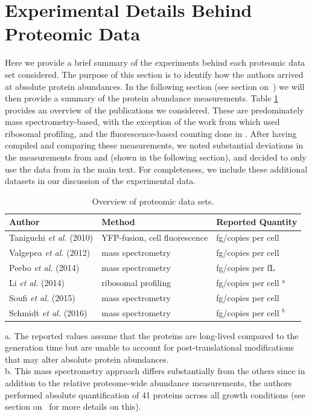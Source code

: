 \section{Experimental Details Behind Proteomic Data}
\label{sec:SI_exp_summary}
Here we provide a brief summary of the experiments behind each proteomic data
set considered. The purpose of this section is to identify how the authors
arrived at absolute protein abundances. In the following section
(see section on~) we will then provide a summary of the
protein abundance measurements. Table \ref{tab:datasets} provides an overview of
the publications we considered. These are predominately mass spectrometry-based,
with the exception of the work from \cite{li2014} which used ribosomal
profiling, and the fluorescence-based counting done in \cite{taniguchi2010}.
After having compiled and comparing these  measurements, we noted substantial
deviations in the measurements from \cite{taniguchi2010} and \cite{soufi2015}
(shown in the following section), and decided to only use the data from
\cite{schmidt2016, li2014, valgepea2013, peebo2015} in the main text. For
completeness, we include these additional datasets in our discussion of the experimental
data.

\begin{table}[bt]
\caption{\label{tab:datasets}Overview of proteomic data sets.}
\begin{tabular}{l l l }
\toprule
Author & Method & Reported Quantity \\
\midrule
Taniguchi \textit{et al.} (2010)  & YFP-fusion, cell fluorescence    & fg/copies per cell      \\
Valgepea \textit{et al.} (2012)   & mass spectrometry                & fg/copies per cell      \\
Peebo \textit{et al.} (2014)      & mass spectrometry                & fg/copies per fL        \\
Li \textit{et al.} (2014)         & ribosomal profiling              & fg/copies per cell $^a$ \\
Soufi \textit{et al.} (2015)      & mass spectrometry                & fg/copies per cell      \\
Schmidt \textit{et al.} (2016)    & mass spectrometry                & fg/copies per cell $^b$ \\
\bottomrule
\end{tabular}

\medskip
a. The reported values assume that the proteins are long-lived compared to the
generation time but are unable to account for post-translational modifications
that may alter absolute protein abundances.
\\
b. This mass spectrometry approach differs substantially from the others since
in addition to the relative proteome-wide abundance measurements, the authors
performed absolute quantification of 41 proteins across all growth conditions
(see section on~ for more details on this).
\end{table}

